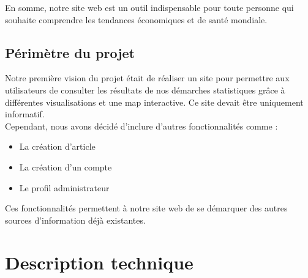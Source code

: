 \documentclass[12pt,a4paper]{report}
\begin{document}
 En somme, notre site web est un outil indispensable pour toute personne qui souhaite comprendre les tendances économiques et de santé mondiale.

\section{Périmètre du projet}
    Notre première vision du projet était de réaliser un site pour permettre aux utilisateurs de consulter les résultats de nos démarches statistiques grâce à différentes visualisations et une map interactive. Ce site devait être uniquement informatif. \\

    Cependant, nous avons décidé d'inclure d'autres fonctionnalités comme :
\begin{itemize}
    \item La création d’article
    \item La création d’un compte 
    \item Le profil administrateur \\
\end{itemize}
    
    Ces fonctionnalités permettent à notre site web de se démarquer des autres sources d'information déjà existantes. 

\chapter{Description technique}
\vspace{-1.5cm}
\end{document}
